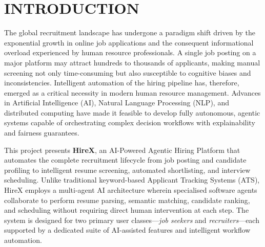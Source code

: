 \documentclass[12pt,a4paper]{report}
\renewcommand{\headrulewidth}{0.4pt}
\renewcommand{\footrulewidth}{0.4pt}
\renewcommand{\headrulewidth}{0pt}
\renewcommand{\footrulewidth}{0.4pt}
\begin{document}
\clearpage
\hypersetup{pageanchor=true}

\pagestyle{fancy}
\fancyhf{}
\fancyhead[R]{\small\textit{\leftmark}}
\fancyfoot[R]{\thepage}
\renewcommand{\headrulewidth}{0.4pt}
\renewcommand{\footrulewidth}{0.4pt}

\chapter{INTRODUCTION}

The global recruitment landscape has undergone a paradigm shift driven by the exponential growth in online job applications and the consequent informational overload experienced by human resource professionals. A single job posting on a major platform may attract hundreds to thousands of applicants, making manual screening not only time-consuming but also susceptible to cognitive biases and inconsistencies. Intelligent automation of the hiring pipeline has, therefore, emerged as a critical necessity in modern human resource management. Advances in Artificial Intelligence (AI), Natural Language Processing (NLP), and distributed computing have made it feasible to develop fully autonomous, agentic systems capable of orchestrating complex decision workflows with explainability and fairness guarantees.

This project presents \textbf{HireX}, an AI-Powered Agentic Hiring Platform that automates the complete recruitment lifecycle from job posting and candidate profiling to intelligent resume screening, automated shortlisting, and interview scheduling. Unlike traditional keyword-based Applicant Tracking Systems (ATS), HireX employs a multi-agent AI architecture wherein specialised software agents collaborate to perform resume parsing, semantic matching, candidate ranking, and scheduling without requiring direct human intervention at each step. The system is designed for two primary user classes---\textit{job seekers} and \textit{recruiters}---each supported by a dedicated suite of AI-assisted features and intelligent workflow automation.
\end{document}
